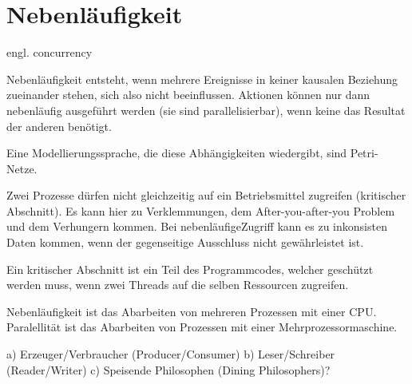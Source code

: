 \section{Nebenläufigkeit}

\begin{answer}
engl. concurrency

Nebenläufigkeit entsteht, wenn mehrere Ereignisse in keiner kausalen Beziehung zueinander stehen, sich also nicht beeinflussen. Aktionen können nur dann nebenläufig ausgeführt werden (sie sind parallelisierbar), wenn keine das Resultat der anderen benötigt.

Eine Modellierungssprache, die diese Abhängigkeiten wiedergibt, sind Petri-Netze.
\end{answer}

\begin{answer}
Zwei Prozesse dürfen nicht gleichzeitig auf ein Betriebsmittel zugreifen (kritischer Abschnitt). Es
kann hier zu Verklemmungen, dem After-you-after-you Problem und dem Verhungern kommen.
Bei nebenläufigeZugriff kann es zu inkonsisten Daten kommen, wenn der gegenseitige Ausschluss
nicht gewährleistet ist.
\end{answer}

\begin{answer}
Ein kritischer Abschnitt ist ein Teil des Programmcodes, welcher geschützt werden muss, wenn zwei Threads auf die selben Ressourcen zugreifen.
\end{answer}

\begin{answer}
Nebenläufigkeit ist das Abarbeiten von mehreren Prozessen mit einer CPU. Paralellität ist das
Abarbeiten von Prozessen mit einer Mehrprozessormaschine.
\end{answer}

\begin{answer}
a) Erzeuger/Verbraucher (Producer/Consumer)
b) Leser/Schreiber (Reader/Writer)
c) Speisende Philosophen (Dining Philosophers)?
\end{answer}

